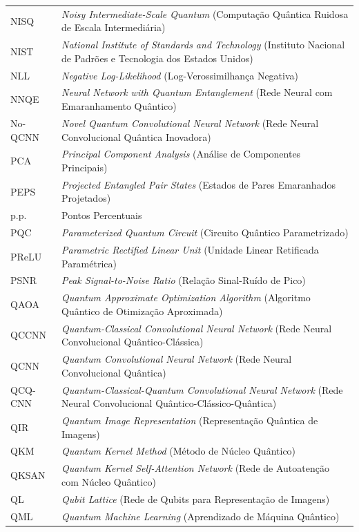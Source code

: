 \documentclass[
    12pt,
    openright,
    oneside,
    a4paper,
    english,
    brazil
]{abntex2}
\begin{document}
\begin{longtable}{@{}p{3.9cm}p{\dimexpr\textwidth-3.9cm-2\tabcolsep\relax}@{}}
NISQ & \textit{Noisy Intermediate-Scale Quantum} (Computação Quântica Ruidosa de Escala Intermediária) \\
NIST & \textit{National Institute of Standards and Technology} (Instituto Nacional de Padrões e Tecnologia dos Estados Unidos) \\
NLL & \textit{Negative Log-Likelihood} (Log-Verossimilhança Negativa) \\
NNQE & \textit{Neural Network with Quantum Entanglement} (Rede Neural com Emaranhamento Quântico) \\
No-QCNN & \textit{Novel Quantum Convolutional Neural Network} (Rede Neural Convolucional Quântica Inovadora) \\
PCA & \textit{Principal Component Analysis} (Análise de Componentes Principais) \\
PEPS & \textit{Projected Entangled Pair States} (Estados de Pares Emaranhados Projetados) \\
p.p. & Pontos Percentuais \\
PQC & \textit{Parameterized Quantum Circuit} (Circuito Quântico Parametrizado) \\
PReLU & \textit{Parametric Rectified Linear Unit} (Unidade Linear Retificada Paramétrica) \\
PSNR & \textit{Peak Signal-to-Noise Ratio} (Relação Sinal-Ruído de Pico) \\
QAOA & \textit{Quantum Approximate Optimization Algorithm} (Algoritmo Quântico de Otimização Aproximada) \\
QCCNN & \textit{Quantum-Classical Convolutional Neural Network} (Rede Neural Convolucional Quântico-Clássica) \\
QCNN & \textit{Quantum Convolutional Neural Network} (Rede Neural Convolucional Quântica) \\
QCQ-CNN & \textit{Quantum-Classical-Quantum Convolutional Neural Network} (Rede Neural Convolucional Quântico-Clássico-Quântica) \\
QIR & \textit{Quantum Image Representation} (Representação Quântica de Imagens) \\
QKM & \textit{Quantum Kernel Method} (Método de Núcleo Quântico) \\
QKSAN & \textit{Quantum Kernel Self-Attention Network} (Rede de Autoatenção com Núcleo Quântico) \\
QL & \textit{Qubit Lattice} (Rede de Qubits para Representação de Imagens) \\
QML & \textit{Quantum Machine Learning} (Aprendizado de Máquina Quântico) \\

\end{longtable}
\end{document}
